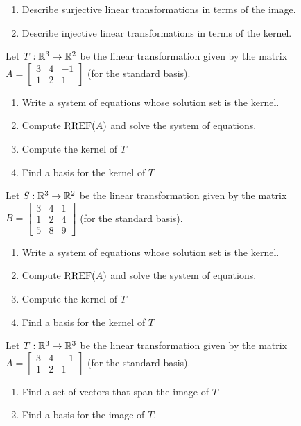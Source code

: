 \documentclass{article}
\begin{document}
\begin{app}
\begin{enumerate}[1)]
\item Describe surjective linear transformations in terms of the image.
\item Describe injective linear transformations in terms of the kernel.
\end{enumerate}

Let $T: \mathbb{R}^3 \rightarrow \mathbb{R}^2$ be the linear transformation given by the matrix $A=\begin{bmatrix} 3 & 4 & -1 \\ 1 & 2 & 1 \end{bmatrix}$ (for the standard basis).
\begin{enumerate}[1)]
\item Write a system of equations whose solution set is the kernel.
\item Compute $\operatorname{RREF}(A)$ and solve the system of equations.
\item Compute the kernel of $T$
\item Find a basis for the kernel of $T$
\end{enumerate}

Let $S: \mathbb{R}^3 \rightarrow \mathbb{R}^2$ be the linear transformation given by the matrix $B=\begin{bmatrix} 3 & 4 & 1 \\ 1 & 2 & 4 \\ 5 & 8 & 9 \end{bmatrix}$ (for the standard basis).
\begin{enumerate}[1)]
\item Write a system of equations whose solution set is the kernel.
\item Compute $\operatorname{RREF}(A)$ and solve the system of equations.
\item Compute the kernel of $T$
\item Find a basis for the kernel of $T$
\end{enumerate}

Let $T: \mathbb{R}^3 \rightarrow \mathbb{R}^3$ be the linear transformation given by the matrix $A=\begin{bmatrix} 3 & 4 & -1 \\ 1 & 2 & 1 \end{bmatrix}$ (for the standard basis).
\begin{enumerate}[1)]
\item Find a set of vectors that span the image of $T$
\item Find a basis for the image of $T$.
\end{enumerate}


\end{app}
\end{document}
